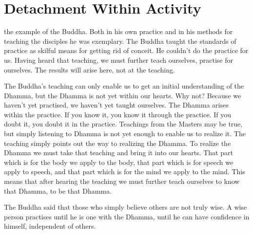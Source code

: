 

\chapter{Detachment Within Activity}

 the example of the Buddha. Both in his own practice and in his methods for teaching the disciples he was exemplary. The Buddha taught the standards of practice as skilful means for getting rid of conceit. He couldn't do the practice for us. Having heard that teaching, we must further teach ourselves, practise for ourselves. The results will arise here, not at the teaching. 

The Buddha's teaching can only enable us to get an initial understanding of the Dhamma, but the Dhamma is not yet within our hearts. Why not? Because we haven't yet practised, we haven't yet taught ourselves. The Dhamma arises within the practice. If you know it, you know it through the practice. If you doubt it, you doubt it in the practice. Teachings from the Masters may be true, but simply listening to Dhamma is not yet enough to enable us to realize it. The teaching simply points out the way to realizing the Dhamma. To realize the Dhamma we must take that teaching and bring it into our hearts. That part which is for the body we apply to the body, that part which is for speech we apply to  speech, and that part which is for the mind we apply to the mind. This means that after hearing the teaching we must further teach ourselves to know that Dhamma, to be that Dhamma. 

The Buddha said that those who simply believe others are not truly wise. A wise person practises until he is one with the Dhamma, until he can have confidence in himself, independent of others. 

